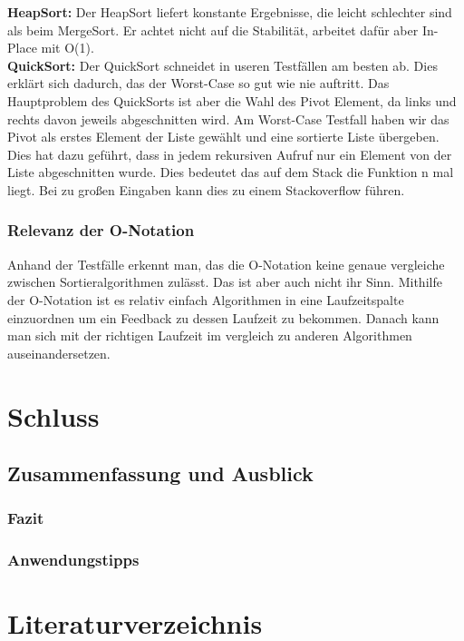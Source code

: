 \documentclass{article}
\begin{document}
\textbf{HeapSort:} Der HeapSort liefert konstante Ergebnisse, die leicht schlechter sind als beim MergeSort. Er achtet nicht auf die Stabilität, arbeitet dafür aber In-Place mit O(1).\\

\textbf{QuickSort:} Der QuickSort schneidet in useren Testfällen am besten ab. Dies erklärt sich dadurch, das der Worst-Case so gut wie nie auftritt. Das Hauptproblem des QuickSorts ist aber die Wahl des Pivot Element, da links und rechts davon jeweils abgeschnitten wird. Am Worst-Case Testfall haben wir das Pivot als erstes Element der Liste gewählt und eine sortierte Liste übergeben. Dies hat dazu geführt, dass in jedem rekursiven Aufruf nur ein Element von der Liste abgeschnitten wurde. Dies bedeutet das auf dem Stack die Funktion n mal liegt. Bei zu großen Eingaben kann dies zu einem Stackoverflow führen. \\






\subsubsection{Relevanz der O-Notation}
Anhand der Testfälle erkennt man, das die O-Notation keine genaue vergleiche zwischen Sortieralgorithmen zulässt. Das ist aber auch nicht ihr Sinn. Mithilfe der O-Notation ist es relativ einfach Algorithmen in eine Laufzeitspalte einzuordnen um ein Feedback zu dessen Laufzeit zu bekommen. Danach kann man sich mit der richtigen Laufzeit im vergleich zu anderen Algorithmen auseinandersetzen.


\section{Schluss}
\subsection{Zusammenfassung und Ausblick}
\subsubsection{Fazit}
\subsubsection{Anwendungstipps}

\section{Literaturverzeichnis}

%



\end{document}
